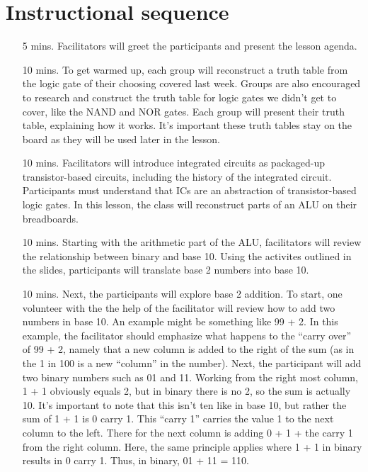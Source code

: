 \documentclass[11pt]{article}
\begin{document}
\section*{Instructional sequence}

\begin{itemize}
\item[5 mins.]
  Facilitators will greet the participants and present the lesson agenda.
\item[10 mins.]
  To get warmed up, each group will reconstruct a truth table from the logic gate of their choosing
  covered last week. Groups are also encouraged to research and construct the
  truth table for logic gates we didn't get to cover, like the NAND and NOR
  gates. Each group will present their truth table, explaining how it
  works. It's important these truth tables stay on the board as they will be
  used later in the lesson.
\item[10 mins.]
  Facilitators will introduce integrated circuits as packaged-up
  transistor-based circuits, including the history of the integrated
  circuit. Participants must understand that ICs are an abstraction of
  transistor-based logic gates. In this lesson, the class will reconstruct parts
  of an ALU on their breadboards.
\item[10 mins.]
  Starting with the arithmetic part of the ALU, facilitators will review the
  relationship between binary and base 10. Using the activites outlined in the
  slides, participants will translate base 2 numbers into base 10.
\item[10 mins.]
  Next, the participants will explore base 2 addition. To start, one volunteer
  with the the help of the facilitator will review how to add two numbers in
  base 10. An example might be something like 99 + 2. In this example, the
  facilitator should emphasize what happens to the ``carry over'' of 99 + 2,
  namely that a new column is added to the right of the sum (as in the 1 in 100
  is a new ``column'' in the number). Next, the participant will add two binary
  numbers such as 01 and 11. Working from the right most column, 1 + 1 obviously
  equals 2, but in binary there is no 2, so the sum is actually 10. It's
  important to note that this isn't ten like in base 10, but rather the sum of 1
  + 1 is 0 carry 1. This ``carry 1'' carries the value 1 to the next column to
  the left. There for the next column is adding 0 + 1 + the carry 1 from the
  right column. Here, the same principle applies where 1 + 1 in binary results
  in 0 carry 1. Thus, in binary, 01 + 11 = 110.

\end{itemize}
\end{document}
